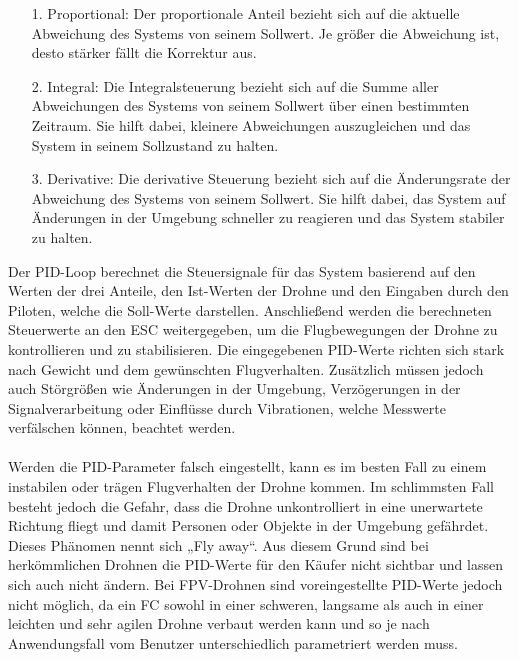             \begin{itemize}
                \item[1.] Proportional: Der proportionale Anteil bezieht sich auf die aktuelle Abweichung des Systems von seinem Sollwert. Je größer die Abweichung ist, desto stärker fällt die Korrektur aus.
                \item[2.] Integral: Die Integralsteuerung bezieht sich auf die Summe aller Abweichungen des Systems von seinem Sollwert über einen bestimmten Zeitraum. Sie hilft dabei, kleinere Abweichungen auszugleichen und das System in seinem Sollzustand zu halten.
                \item[3.] Derivative: Die derivative Steuerung bezieht sich auf die Änderungsrate der Abweichung des Systems von seinem Sollwert. Sie hilft dabei, das System auf Änderungen in der Umgebung schneller zu reagieren und das System stabiler zu halten.
            \end{itemize}

            Der PID-Loop berechnet die Steuersignale für das System basierend auf den Werten der drei
            Anteile, den Ist-Werten der Drohne und den Eingaben durch den Piloten, welche die Soll-Werte
            darstellen. Anschließend werden die berechneten Steuerwerte an den ESC weitergegeben, um
            die Flugbewegungen der Drohne zu kontrollieren und zu stabilisieren. Die eingegebenen PID-Werte
            richten sich stark nach Gewicht und dem gewünschten Flugverhalten. Zusätzlich müssen jedoch
            auch Störgrößen wie Änderungen in der Umgebung, Verzögerungen in der Signalverarbeitung oder
            Einflüsse durch Vibrationen, welche Messwerte verfälschen können, beachtet werden. \\
            \\
            Werden die PID-Parameter falsch eingestellt, kann es im besten Fall zu einem instabilen oder
            trägen Flugverhalten der Drohne kommen. Im schlimmsten Fall besteht jedoch die Gefahr, dass
            die Drohne unkontrolliert in eine unerwartete Richtung fliegt und damit Personen oder Objekte
            in der Umgebung gefährdet. Dieses Phänomen nennt sich „Fly away“. Aus diesem Grund sind bei
            herkömmlichen Drohnen die PID-Werte für den Käufer nicht sichtbar und lassen sich auch nicht
            ändern. Bei FPV-Drohnen sind voreingestellte PID-Werte jedoch nicht möglich, da ein FC sowohl
            in einer schweren, langsame als auch in einer leichten und sehr agilen Drohne verbaut werden
            kann und so je nach Anwendungsfall vom Benutzer unterschiedlich parametriert werden muss.

